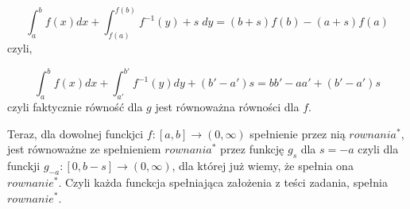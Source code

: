 \documentclass{article}
\def\rw{$rownanie^*$}
\begin{document}
$$\int_a^bf(x)dx + \int_{f(a)}^{f(b)}f^{-1}(y)+s \;dy = (b+s)f(b) - (a+s)f(a)$$
czyli, 

$$\int_a^bf(x)dx + \int_{a'}^{b'}f^{-1}(y)dy + (b'-a')s = bb'-aa' + (b'-a')s$$
czyli faktycznie równość dla $g$ jest równoważna równości dla $f$. \newline

Teraz, dla dowolnej funckjci $f:[a,b] \to (0,\infty)$ spełnienie przez nią $rownania^*$, jest równoważne ze spełnieniem $rownania^*$ przez funkcję $g_{s}$ dla $s=-a$ czyli dla funckji $g_{-a}:[0,b-s] \to (0, \infty)$, dla której już wiemy, że spełnia ona \rw. Czyli każda funckcja spełniająca założenia z teści zadania, spełnia \rw.
\end{document}
